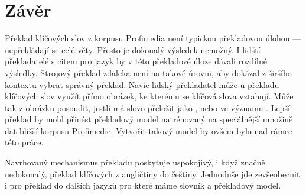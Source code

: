 \section{Závěr}

Překlad klíčových slov z korpusu Profimedia není typickou překladovou úlohou --- nepřekládají se celé věty. Přesto je dokonalý výsledek nemožný. I lidští překladatelé s citem pro jazyk by v této překladové úloze dávali rozdílné výsledky. Strojový překlad zdaleka není na takové úrovni, aby dokázal z širšího kontextu vybrat správný překlad. Navíc lidský překladatel může u překladu klíčových slov využít přímo obrázek, ke kterému se klíčová slova vztahují. Může tak z obrázku posoudit, jestli má slovo  přeložit jako , nebo ve významu . Lepší překlad by mohl přinést překladový model natrénovaný na speciálnější množině dat bližší korpusu Profimedie. Vytvořit takový model by ovšem bylo nad rámec této práce.

Navrhovaný mechanismus překladu poskytuje uspokojivý, i když značně nedokonalý, překlad klíčových z angličtiny do češtiny. Jednoduše jde zevšeobecnit i pro překlad do dalších jazyků pro které máme slovník a překladový model.

